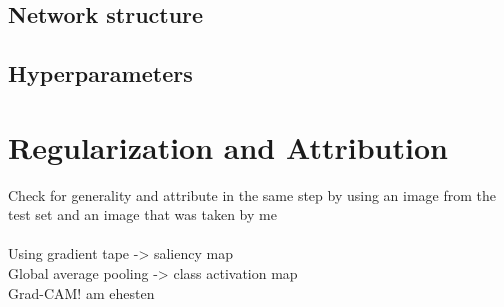 \documentclass[]{article}
\begin{document}
\subsection{Network structure}
\subsection{Hyperparameters}


\section{Regularization and Attribution}
Check for generality and attribute in the same step by using an image from the test set and an image that was taken by me\\
\\
Using gradient tape -> saliency map\\
Global average pooling -> class activation map\\
Grad-CAM! am ehesten
\end{document}
